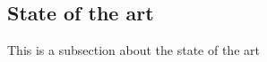 \documentclass[../../sections/introduction.tex]{subfiles}
\begin{document}
\subsection{State of the art}
    This is a subsection about the state of the art
\end{document}
